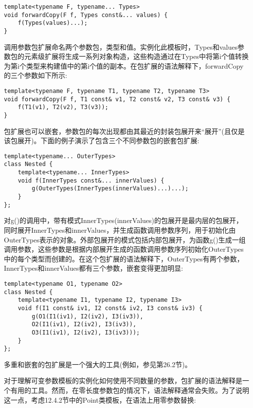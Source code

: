 \begin{lstlisting}[style=styleCXX]
template<typename F, typename... Types>
void forwardCopy(F f, Types const&... values) {
	f(Types(values)...);
}
\end{lstlisting}

调用参数包扩展命名两个参数包，类型和值。实例化此模板时，Types和values参数包的元素级扩展将生成一系列对象构造，这些构造通过在Types中将第i个值转换为第i个类型来构建值中的第i个值的副本。在包扩展的语法解释下，forwardCopy的三个参数如下所示:

\begin{lstlisting}[style=styleCXX]
template<typename F, typename T1, typename T2, typename T3>
void forwardCopy(F f, T1 const& v1, T2 const& v2, T3 const& v3) {
	f(T1(v1), T2(v2), T3(v3));
}
\end{lstlisting}

包扩展也可以嵌套，参数包的每次出现都由其最近的封装包展开来“展开”(且仅是该包展开)。下面的例子演示了包含三个不同参数包的嵌套包扩展:

\begin{lstlisting}[style=styleCXX]
template<typename... OuterTypes>
class Nested {
	template<typename... InnerTypes>
	void f(InnerTypes const&... innerValues) {
		g(OuterTypes(InnerTypes(innerValues)...)...);
	}
};
\end{lstlisting}

对g()的调用中，带有模式InnerTypes(innerValues)的包展开是最内层的包展开，同时展开InnerTypes和innerValues，并生成函数调用参数序列，用于初始化由OuterTypes表示的对象。外部包展开的模式包括内部包展开，为函数g()生成一组调用参数，这些参数是根据内部展开生成的函数调用参数序列初始化OuterTypes中的每个类型而创建的。在这个包扩展的语法解释下，OuterTypes有两个参数，InnerTypes和innerValues都有三个参数，嵌套变得更加明显:

\begin{lstlisting}[style=styleCXX]
template<typename O1, typename O2>
class Nested {
	template<typename I1, typename I2, typename I3>
	void f(I1 const& iv1, I2 const& iv2, I3 const& iv3) {
		g(O1(I1(iv1), I2(iv2), I3(iv3)),
		O2(I1(iv1), I2(iv2), I3(iv3)),
		O3(I1(iv1), I2(iv2), I3(iv3)));
	}
};
\end{lstlisting}

多重和嵌套的包扩展是一个强大的工具(例如，参见第26.2节)。


对于理解可变参数模板的实例化如何使用不同数量的参数，包扩展的语法解释是一个有用的工具。然而，在零长度参数包的情况下，语法解释通常会失败。为了说明这一点，考虑12.4.2节中的Point类模板，在语法上用零参数替换:

